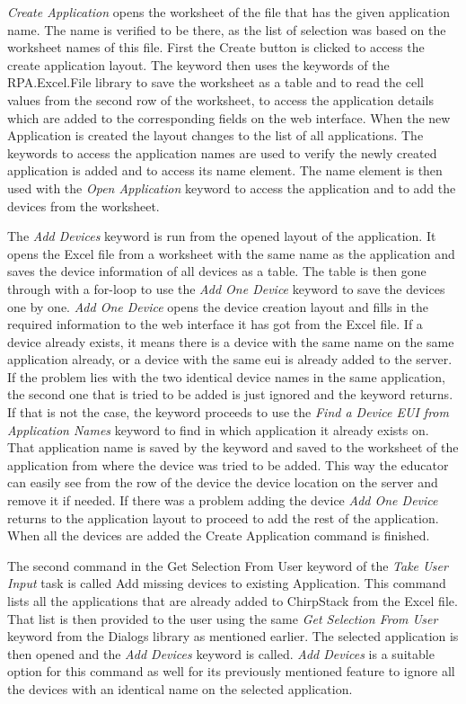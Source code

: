 \clearpage

\textit{Create Application} opens the worksheet of the  file that has the given application name.
The name is verified to be there, as the list of selection was based on the worksheet names of this file.
First the Create button is clicked to access the create application layout.
The keyword then uses the keywords of the RPA.Excel.File library to save the worksheet as a table and to read the cell values from the second row of the worksheet, to access the application details which are added to the corresponding fields on the web interface.
When the new Application is created the layout changes to the list of all applications.
The keywords to access the application names are used to verify the newly created application is added and to access its name element.
The name element is then used with the \textit{Open Application} keyword to access the application and to add the devices from the worksheet.

The \textit{Add Devices} keyword is run from the opened layout of the  application.
It opens the Excel file from a worksheet with the same name as the application and saves the device information of all devices as a table.
The table is then gone through with a for-loop to use the \textit{Add One Device} keyword to save the devices one by one.
\textit{Add One Device} opens the device creation layout and fills in the required information to the web interface it has got from the Excel file.
If a device already exists, it means there is a device with the same name on the same application already, or a device with the same \gls{eui} is already added to the server.
If the problem lies with the two identical device names in the same application, the second one that is tried to be added is just ignored and the keyword returns.
If that is not the case, the keyword proceeds to use the \textit{Find a Device EUI from Application Names} keyword to find in which application it already exists on.
That application name is saved by the keyword and saved to the worksheet of the application from where the device was tried to be added.
This way the educator can easily see from the row of the device the device location on the server and remove it if needed.
If there was a problem adding the device \textit{Add One Device} returns to the application layout to proceed to add the rest of the application.
When all the devices are added the Create Application command is finished.

The second command in the Get Selection From User keyword of the \textit{Take User Input} task is called Add missing devices to existing Application.
This command lists all the applications that are already added to ChirpStack from the Excel file.
That list is then provided to the user using the same \textit{Get Selection From User} keyword from the Dialogs library \cite{robotFramework:dialogsLibrary} as mentioned earlier.
The selected application is then opened and the \textit{Add Devices} keyword is called.
\textit{Add Devices} is a suitable option for this command as well for its previously mentioned feature to ignore all the devices with an identical name on the selected application.

